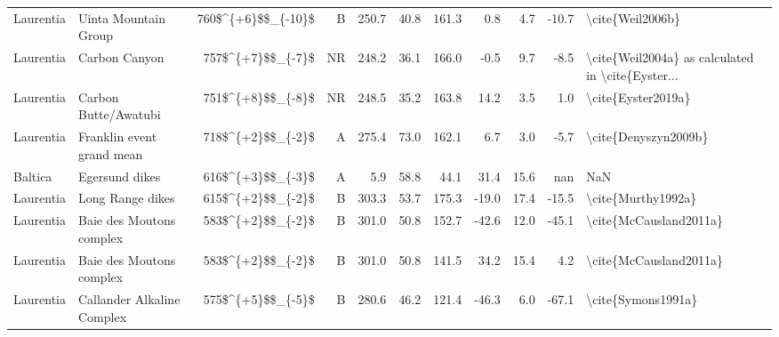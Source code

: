 \begin{longtable}{p{1 in}p{1 in}rrrrrrrr}
                     Laurentia &                               Uinta Mountain Group &     760\$\textasciicircum \{+6\}\$\$\_\{-10\}\$ &      B &     250.7 &      40.8 & 161.3 &   0.8 &       4.7 &       -10.7 &                                   \textbackslash cite\{Weil2006b\} \\
                     Laurentia &                                      Carbon Canyon &      757\$\textasciicircum \{+7\}\$\$\_\{-7\}\$ &     NR &     248.2 &      36.1 & 166.0 &  -0.5 &       9.7 &        -8.5 &  \textbackslash cite\{Weil2004a\} as calculated in \textbackslash cite\{Eyster... \\
                     Laurentia &                               Carbon Butte/Awatubi &      751\$\textasciicircum \{+8\}\$\$\_\{-8\}\$ &     NR &     248.5 &      35.2 & 163.8 &  14.2 &       3.5 &         1.0 &                                 \textbackslash cite\{Eyster2019a\} \\
                     Laurentia &                          Franklin event grand mean &      718\$\textasciicircum \{+2\}\$\$\_\{-2\}\$ &      A &     275.4 &      73.0 & 162.1 &   6.7 &       3.0 &        -5.7 &                               \textbackslash cite\{Denyszyn2009b\} \\
                       Baltica &                                     Egersund dikes &      616\$\textasciicircum \{+3\}\$\$\_\{-3\}\$ &      A &       5.9 &      58.8 &  44.1 &  31.4 &      15.6 &         nan &                                                NaN \\
                     Laurentia &                                   Long Range dikes &      615\$\textasciicircum \{+2\}\$\$\_\{-2\}\$ &      B &     303.3 &      53.7 & 175.3 & -19.0 &      17.4 &       -15.5 &                                 \textbackslash cite\{Murthy1992a\} \\
                     Laurentia &                           Baie des Moutons complex &      583\$\textasciicircum \{+2\}\$\$\_\{-2\}\$ &      B &     301.0 &      50.8 & 152.7 & -42.6 &      12.0 &       -45.1 &                             \textbackslash cite\{McCausland2011a\} \\
                     Laurentia &                           Baie des Moutons complex &      583\$\textasciicircum \{+2\}\$\$\_\{-2\}\$ &      B &     301.0 &      50.8 & 141.5 &  34.2 &      15.4 &         4.2 &                             \textbackslash cite\{McCausland2011a\} \\
                     Laurentia &                         Callander Alkaline Complex &      575\$\textasciicircum \{+5\}\$\$\_\{-5\}\$ &      B &     280.6 &      46.2 & 121.4 & -46.3 &       6.0 &       -67.1 &                                 \textbackslash cite\{Symons1991a\} \\

\end{longtable}
